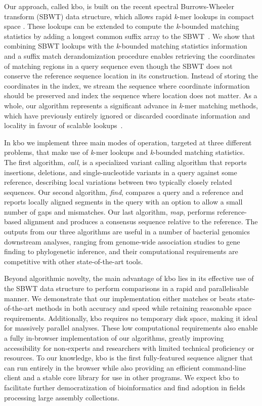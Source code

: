 \documentclass[unnumsec,webpdf,contemporary,large]{oup-authoring-template}%
\theoremstyle{thmstyleone}%
\theoremstyle{thmstyletwo}%
\theoremstyle{thmstylethree}%
\begin{document}
Our approach, called {\sf kbo}, is built on the recent spectral Burrows-Wheeler transform (SBWT) data structure, which allows rapid \emph{k}-mer lookups in compact space \cite{alanko2023small}. These lookups can be extended to compute the \emph{k}-bounded matching statistics by adding a longest common suffix array to the SBWT~\cite{alanko2023longest,alanko2024finimizers}. We show that combining SBWT lookups with the \emph{k}-bounded matching statistics information and a suffix match derandomization procedure enables retrieving the coordinates of matching regions in a query sequence even though the SBWT does not conserve the reference sequence location in its construction. Instead of storing the coordinates in the index, we stream the sequence where coordinate information should be preserved and index the sequence where location does not matter. As a whole, our algorithm represents a significant advance in \emph{k}-mer matching methods, which have previously entirely ignored or discarded coordinate information and locality in favour of scalable lookups~\cite{alanko2023themisto,fan2024fulgor}.

In {\sf kbo} we implement three main modes of operation, targeted at three different problems, that make use of \emph{k}-mer lookups and \emph{k}-bounded matching statistics. The first algorithm, \textit{call}, is a specialized variant calling algorithm that reports insertions, deletions, and single-nucleotide variants in a query against some reference, describing local variations between two typically closely related sequences. Our second algorithm, \textit{find}, compares a query and a reference and reports locally aligned segments in the query with an option to allow a small number of gaps and mismatches. Our last algorithm, \textit{map}, performs reference-based alignment and produces a consensus sequence relative to the reference. The outputs from our three algorithms are useful in a number of bacterial genomics downstream analyses, ranging from genome-wide association studies to gene finding to phylogenetic inference, and their computational requirements are competitive with other state-of-the-art tools.

Beyond algorithmic novelty, the main advantage of {\sf kbo} lies in its effective use of the SBWT data structure to perform comparisons in a rapid and parallelisable manner. We demonstrate that our implementation either matches or beats state-of-the-art methods in both accuracy and speed while retaining reasonable space requirements. Additionally, {\sf kbo} requires no temporary disk space, making it ideal for massively parallel analyses. These low computational requirements also enable a fully in-browser implementation of our algorithms, greatly improving accessibility for non-experts and researchers with limited technical proficiency or resources. To our knowledge, {\sf kbo} is the first fully-featured sequence aligner that can run entirely in the browser while also providing an efficient command-line client and a stable core library for use in other programs. We expect {\sf kbo} to facilitate further democratization of bioinformatics and find adoption in fields processing large assembly collections.
\end{document}

